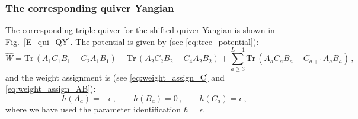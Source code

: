 \documentclass[12pt,a4paper]{article}
\renewcommand{\(}{\left(}
\renewcommand{\)}{\right)}
\renewcommand{\(}{\left(}
\renewcommand{\)}{\right)}
\begin{document}
\subsubsection{The corresponding quiver Yangian}

The corresponding triple quiver for the shifted quiver Yangian is shown in Fig.~\ref{E_qui_QY}. 
The potential is given by (see \eqref{eq:tree_potential}):
{\small
\begin{equation}\label{eq:E_triple_potential}
\widehat{W}=\mathrm{Tr}\,(A_1C_1B_1-C_2A_1B_1)+\mathrm{Tr}\,(A_2C_2B_2-C_4A_2B_2)+\sum_{a\geq3}^{L-1}\mathrm{Tr}\,(A_aC_aB_a-C_{a+1}A_aB_a)\,,
\end{equation}}
and the weight assignment is (see \eqref{eq:weight_assign_C} and \eqref{eq:weight_assign_AB}):
\begin{equation}
h(A_a)=-\epsilon\,,\qquad h(B_a)=0\,,\qquad h(C_a)=\epsilon\,,
\end{equation}
where we have used the parameter identification $\hbar=\epsilon$.
\end{document}
